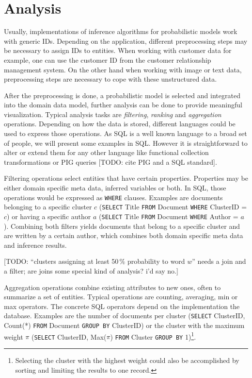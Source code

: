 \section{Analysis}

Usually, implementations of inference algorithms for probabilistic models work with generic IDs. Depending on the application, different preprocessing steps may be necessary to assign IDs to entities. When working with customer data for example, one can use the customer ID from the customer relationship management system. On the other hand when working with image or text data, preprocessing steps are necessary to cope with these unstructured data.

After the preprocessing is done, a probabilistic model is selected and integrated into the domain data model, further analysis can be done to provide meaningful visualization. Typical analysis tasks are \emph{filtering}, \emph{ranking} and \emph{aggregation} operations. Depending on how the data is stored, different languages could be used to express those operations. As SQL is a well known language to a broad set of people, we will present some examples in SQL. However it is straightforward to alter or extend them for any other language like functional collection transformations or PIG queries [TODO: cite PIG and a SQL standard].

Filtering operations select entities that have certain properties. Properties may be either domain specific meta data, inferred variables or both. In SQL, those operations would be expressed as \texttt{WHERE} clauses. Examples are documents belonging to a specific cluster $c$ (\texttt{SELECT} Title \texttt{FROM} Document \texttt{WHERE} ClusterID = $c$) or having a specific author $a$ (\texttt{SELECT} Title \texttt{FROM} Document \texttt{WHERE} Author = $a$). Combining both filters yields documents that belong to a specific cluster and are written by a certain author, which combines both domain specific meta data and inference results.

[TODO: ``clusters assigning at least 50\,\% probability to word $w$'' needs a join and a filter; are joins some special kind of analysis? i'd say no.]

Aggregation operations combine existing attributes to new ones, often to summarize a set of entities. Typical operations are counting, averaging, min or max operators. The concrete SQL operators depend on the implementation the database. Examples are the number of documents per cluster (\texttt{SELECT} ClusterID, Count(*) \texttt{FROM} Document \texttt{GROUP BY} ClusterID) or the cluster with the maximum weight $\pi$ (\texttt{SELECT} ClusterID, Max($\pi$) \texttt{FROM} Cluster \texttt{GROUP BY} 1)\footnote{Selecting the cluster with the highest weight could also be accomplished by sorting and limiting the results to one record.}.

